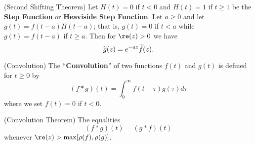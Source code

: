 \begin{thm}{(Second Shifting Theorem)}%
Let $H(t)=0$ if $t<0$ and $H(t)=1$ if $t\geq1$ be the
\textbf{Step Function} or \textbf{Heaviside Step Function}. Let
$a\geq0$ and let $g(t)=f(t-a)H(t-a)$; that is, $g(t)=0$ if $t<a$
while $g(t)=f(t-a)$ if $t\geq a$. Then for $\re(z)>0$ we have
\begin{equation}%
\wt{g}(z)=e^{-az}\wt{f}(z).
\end{equation}
\end{thm}
\begin{defn}{(Convolution)}%
The ``\textbf{Convolution}'' of two functions $f(t)$ and $g(t)$
is defined for $t\geq0$ by
\begin{equation}%
(f*g)(t)=\int^{\infty}_{0}f(t-\tau)g(\tau)d\tau
\end{equation}
where we set $f(t)=0$ if $t<0$.
\end{defn}
\begin{thm}{(Convolution Theorem)}%
The equalities
\begin{equation}%
(f*g)(t) = (g*f)(t)
\end{equation}
whenever $\re(z)>\max[\rho(f),\rho(g)]$.
\end{thm}




